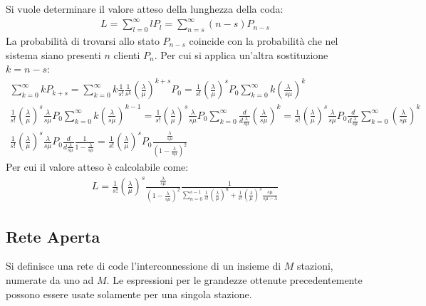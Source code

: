 \documentclass{article}
\numberwithin{equation}{subsection}
\begin{document}
Si vuole determinare il valore atteso della lunghezza della coda:
\begin{gather*}
    L=\displaystyle\sum_{l=0}^{\infty}lP_l=\sum_{n=s}^{\infty}(n-s)P_{n-s}
\end{gather*}
La probabilità di trovarsi allo stato $P_{n-s}$ coincide con la probabilità che nel sistema siano presenti $n$ clienti $P_n$. Per cui si applica un'altra sostituzione $k=n-s$:
\begin{gather*}
    \displaystyle\sum_{k=0}^{\infty}kP_{k+s}=\sum_{k=0}^{\infty}k\frac{1}{s!}\frac{1}{s^k}\left(\frac{\lambda}{\mu}\right)^{k+s}P_0=\frac{1}{s!}\left(\frac{\lambda}{\mu}\right)^{s}P_0\sum_{k=0}^{\infty}k\left(\frac{\lambda}{s\mu}\right)^{k}\\
    \displaystyle\frac{1}{s!}\left(\frac{\lambda}{\mu}\right)^{s}\frac{\lambda}{s\mu}P_0\sum_{k=0}^{\infty}k\left(\frac{\lambda}{s\mu}\right)^{k-1}=\frac{1}{s!}\left(\frac{\lambda}{\mu}\right)^{s}\frac{\lambda}{s\mu}P_0\sum_{k=0}^{\infty}\frac{d}{d\frac{\lambda}{s\mu}}\left(\frac{\lambda}{s\mu}\right)^{k}
    =\frac{1}{s!}\left(\frac{\lambda}{\mu}\right)^{s}\frac{\lambda}{s\mu}P_0\frac{d}{d\frac{\lambda}{s\mu}}\sum_{k=0}^{\infty}\left(\frac{\lambda}{s\mu}\right)^{k}\\
    \frac{1}{s!}\left(\frac{\lambda}{\mu}\right)^{s}\frac{\lambda}{s\mu}P_0\frac{d}{d\frac{\lambda}{s\mu}}\frac{1}{1-\displaystyle\frac{\lambda}{s\mu}}=\frac{1}{s!}\left(\frac{\lambda}{\mu}\right)^{s}P_0\frac{\displaystyle\frac{\lambda}{s\mu}}{\left(1-\displaystyle\frac{\lambda}{s\mu}\right)^2}
\end{gather*}
Per cui il valore atteso è calcolabile come:
\begin{gather}
    L=\frac{1}{s!}\left(\frac{\lambda}{\mu}\right)^{s}\frac{\displaystyle\frac{\lambda}{s\mu}}{\left(1-\displaystyle\frac{\lambda}{s\mu}\right)^2}\frac{1}{\displaystyle\sum_{n=0}^{s-1}\frac{1}{s!}\left(\frac{\lambda}{\mu}\right)^n+\frac{1}{s!}\left(\frac{\lambda}{\mu}\right)^s\frac{s\mu}{s\mu-\lambda}}
\end{gather}

\subsection{Rete Aperta}

Si definisce una rete di code l'interconnessione di un insieme di $M$ stazioni, numerate da uno ad $M$. Le espressioni per le grandezze ottenute precedentemente possono essere 
usate solamente per una singola stazione. 
\end{document}

